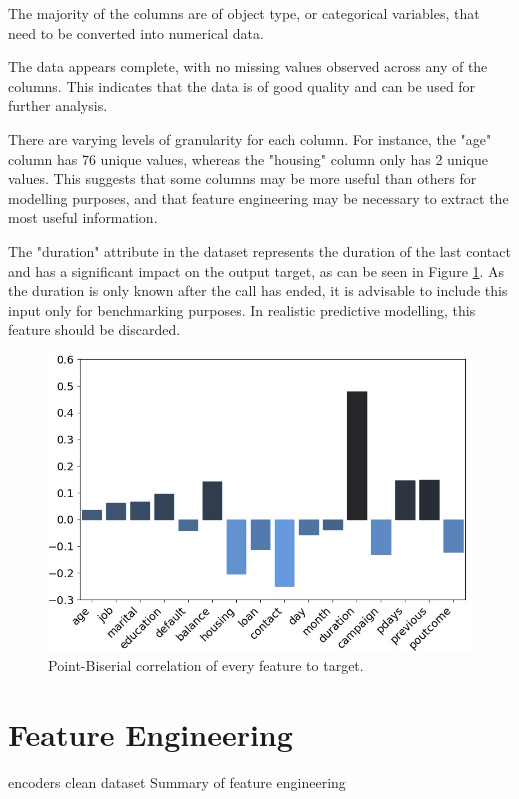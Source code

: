 \documentclass[conference]{IEEEtran}
\begin{document}
The majority of the columns are of object type, or categorical variables, that need to be converted into numerical data.

The data appears complete, with no missing values observed across any of the columns. This indicates that the data is of good quality and can be used for further analysis.

There are varying levels of granularity for each column. For instance, the "age" column has 76 unique values, whereas the "housing" column only has 2 unique values. This suggests that some columns may be more useful than others for modelling purposes, and that feature engineering may be necessary to extract the most useful information.

The "duration" attribute in the dataset represents the duration of the last contact and has a significant impact on the output target, as can be seen in Figure \ref{fig_corr_biserial}. As the duration is only known after the call has ended, it is advisable to include this input only for benchmarking purposes. In realistic predictive modelling, this feature should be discarded.

\begin{figure}[htbp]
\centering
\centerline{\includegraphics[width=\columnwidth] {assets/features/corr_to_target_fit.png}}
\caption{Point-Biserial correlation of every feature to target.}
\label{fig_corr_biserial}
\end{figure}

\section{Feature Engineering}
encoders
clean dataset
Summary of feature engineering
\end{document}
